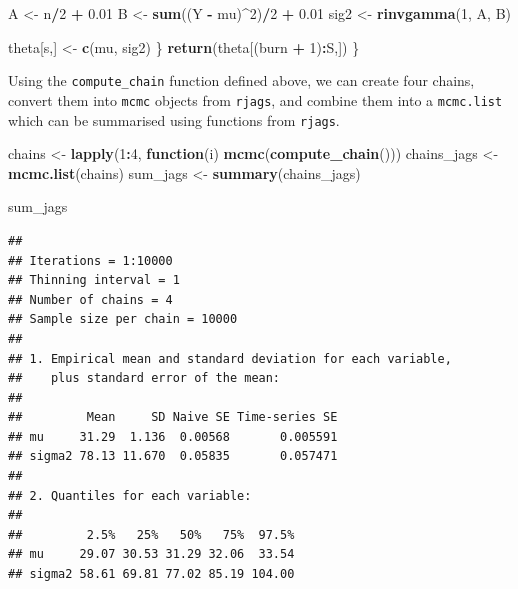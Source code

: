 \documentclass[
]{homework}
\newenvironment{Shaded}{\begin{snugshade}}{\end{snugshade}}
\newcommand{\ControlFlowTok}[1]{\textcolor[rgb]{0.13,0.29,0.53}{\textbf{#1}}}
\newcommand{\DecValTok}[1]{\textcolor[rgb]{0.00,0.00,0.81}{#1}}
\newcommand{\FloatTok}[1]{\textcolor[rgb]{0.00,0.00,0.81}{#1}}
\newcommand{\FunctionTok}[1]{\textcolor[rgb]{0.13,0.29,0.53}{\textbf{#1}}}
\newcommand{\NormalTok}[1]{#1}
\newcommand{\OtherTok}[1]{\textcolor[rgb]{0.56,0.35,0.01}{#1}}
\newcommand{\SpecialCharTok}[1]{\textcolor[rgb]{0.81,0.36,0.00}{\textbf{#1}}}
\begin{document}
\begin{Shaded}
\begin{Highlighting}[]
\NormalTok{    A }\OtherTok{\textless{}{-}}\NormalTok{ n}\SpecialCharTok{/}\DecValTok{2} \SpecialCharTok{+} \FloatTok{0.01}
\NormalTok{    B }\OtherTok{\textless{}{-}} \FunctionTok{sum}\NormalTok{((Y }\SpecialCharTok{{-}}\NormalTok{ mu)}\SpecialCharTok{\^{}}\DecValTok{2}\NormalTok{)}\SpecialCharTok{/}\DecValTok{2} \SpecialCharTok{+} \FloatTok{0.01}
\NormalTok{    sig2 }\OtherTok{\textless{}{-}} \FunctionTok{rinvgamma}\NormalTok{(}\DecValTok{1}\NormalTok{, A, B)}
    
\NormalTok{    theta[s,] }\OtherTok{\textless{}{-}} \FunctionTok{c}\NormalTok{(mu, sig2)}
\NormalTok{  \}}
  \FunctionTok{return}\NormalTok{(theta[(burn }\SpecialCharTok{+} \DecValTok{1}\NormalTok{)}\SpecialCharTok{:}\NormalTok{S,])}
\NormalTok{\}}
\end{Highlighting}
\end{Shaded}

Using the \texttt{compute\_chain} function defined above, we can create four chains, convert them into \texttt{mcmc} objects from \texttt{rjags},
and combine them into a \texttt{mcmc.list} which can be summarised using functions from \texttt{rjags}.

\begin{Shaded}
\begin{Highlighting}[]
\NormalTok{chains }\OtherTok{\textless{}{-}} \FunctionTok{lapply}\NormalTok{(}\DecValTok{1}\SpecialCharTok{:}\DecValTok{4}\NormalTok{, }\ControlFlowTok{function}\NormalTok{(i) }\FunctionTok{mcmc}\NormalTok{(}\FunctionTok{compute\_chain}\NormalTok{()))}
\NormalTok{chains\_jags }\OtherTok{\textless{}{-}} \FunctionTok{mcmc.list}\NormalTok{(chains)}
\NormalTok{sum\_jags }\OtherTok{\textless{}{-}} \FunctionTok{summary}\NormalTok{(chains\_jags)}

\NormalTok{sum\_jags}
\end{Highlighting}
\end{Shaded}

\begin{verbatim}
## 
## Iterations = 1:10000
## Thinning interval = 1 
## Number of chains = 4 
## Sample size per chain = 10000 
## 
## 1. Empirical mean and standard deviation for each variable,
##    plus standard error of the mean:
## 
##         Mean     SD Naive SE Time-series SE
## mu     31.29  1.136  0.00568       0.005591
## sigma2 78.13 11.670  0.05835       0.057471
## 
## 2. Quantiles for each variable:
## 
##         2.5%   25%   50%   75%  97.5%
## mu     29.07 30.53 31.29 32.06  33.54
## sigma2 58.61 69.81 77.02 85.19 104.00
\end{verbatim}
\end{document}
